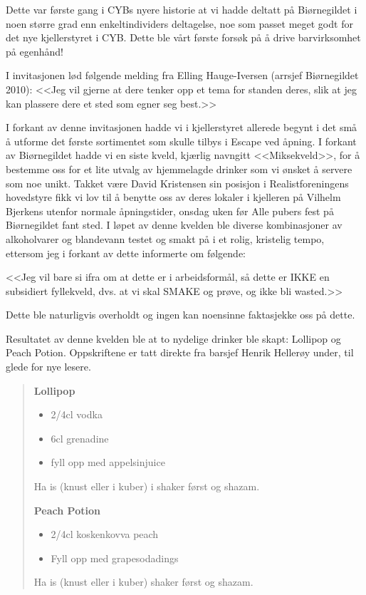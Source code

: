 Dette var første gang i CYBs nyere historie at vi hadde deltatt på Biørnegildet i noen større grad enn enkeltindividers deltagelse, noe som passet meget godt for det nye kjellerstyret i CYB. Dette ble vårt første forsøk på å drive barvirksomhet på egenhånd!

I invitasjonen lød følgende melding fra Elling Hauge-Iversen (arrsjef Biørnegildet 2010): <<Jeg vil gjerne at dere tenker opp et tema for standen deres, slik at jeg kan plassere dere et sted som egner seg best.>>

I forkant av denne invitasjonen hadde vi i kjellerstyret allerede begynt i det små å utforme det første sortimentet som skulle tilbys i Escape ved åpning. I forkant av Biørnegildet hadde vi en siste kveld, kjærlig navngitt <<Miksekveld>>, for å bestemme oss for et lite utvalg av hjemmelagde drinker som vi ønsket å servere som noe unikt. Takket være David Kristensen sin posisjon i Realistforeningens hovedstyre fikk vi lov til å benytte oss av deres lokaler i kjelleren på Vilhelm Bjerkens utenfor normale åpningstider, onsdag uken før Alle pubers fest på Biørnegildet fant sted. I løpet av denne kvelden ble diverse kombinasjoner av alkoholvarer og blandevann testet og smakt på i et rolig, kristelig tempo, ettersom jeg i forkant av dette informerte om følgende:

<<Jeg vil bare si ifra om at dette er i arbeidsformål, så dette er IKKE en subsidiert fyllekveld, dvs. at vi skal SMAKE og prøve, og ikke bli wasted.>>

Dette ble naturligvis overholdt og ingen kan noensinne faktasjekke oss på dette.

Resultatet av denne kvelden ble at to nydelige drinker ble skapt: Lollipop og Peach Potion. Oppskriftene er tatt direkte fra barsjef Henrik Hellerøy under, til glede for nye lesere.

\begin{quote}
	\textbf{Lollipop}
	
	\begin{itemize}
		\item 2/4cl vodka
		\item 6cl grenadine
		\item fyll opp med appelsinjuice
	\end{itemize}
	
	Ha is (knust eller i kuber) i shaker først og shazam.
	
	\textbf{Peach Potion}
	
	\begin{itemize}
		\item 2/4cl koskenkovva peach
		\item Fyll opp med grapesodadings
	\end{itemize}
	
	Ha is (knust eller i kuber) shaker først og shazam.
\end{quote}

